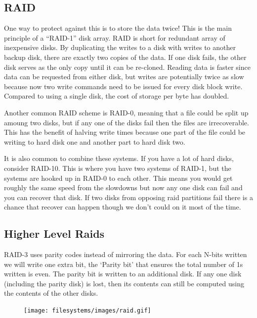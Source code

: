 \subsection{RAID}\label{redundancy}

One way to protect against this is to store the data twice! This is the main principle of a ``RAID-1'' disk array. RAID is short for redundant array of inexpensive disks. By duplicating the writes to a disk with writes to another backup disk, there are exactly two copies of the data. If one disk fails, the other disk serves as the only copy until it can be re-cloned. Reading data is faster since data can be requested from either disk, but writes are potentially twice as slow because now two write commands need to be issued for every disk block write. Compared to using a single disk, the cost of storage per byte has doubled.

Another common RAID scheme is RAID-0, meaning that a file could be split up amoung two disks, but if any one of the disks fail then the files are irrecoverable. This has the benefit of halving write times because one part of the file could be writing to hard disk one and another part to hard disk two.

It is also common to combine these systems. If you have a lot of hard disks, consider RAID-10. This is where you have two systems of RAID-1, but the systems are hooked up in RAID-0 to each other. This means you would get roughly the same speed from the slowdowns but now any one disk can fail and you can recover that disk. If two disks from opposing raid partitions fail there is a chance that recover can happen though we don't could on it most of the time.

\subsection{Higher Level Raids}

RAID-3 uses parity codes instead of mirroring the data. For each N-bits written we will write one extra bit, the `Parity bit' that ensures the total number of 1s written is even. The parity bit is written to an additional disk. If any one disk (including the parity disk) is lost, then its contents can still be computed using the contents of the other disks.

\begin{figure}[htbp]
\centering
\texttt{[image: filesystems/images/raid.gif]}
\caption{}
\end{figure}

